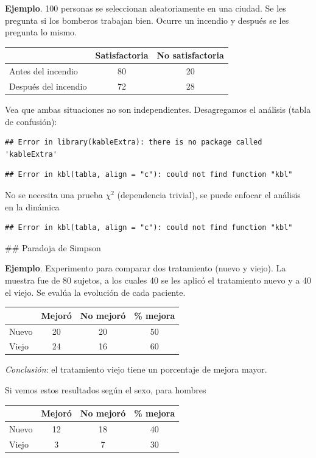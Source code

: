 \documentclass[
  12pt,
]{book}
\begin{document}
\textbf{Ejemplo}. 100 personas se seleccionan aleatoriamente en una ciudad. Se les pregunta si los bomberos trabajan bien. Ocurre un incendio y después se les pregunta lo mismo.

\begin{longtable}[]{@{}lcc@{}}
\toprule
& Satisfactoria & No satisfactoria\tabularnewline
\midrule
\endhead
Antes del incendio & 80 & 20\tabularnewline
Después del incendio & 72 & 28\tabularnewline
\bottomrule
\end{longtable}

Vea que ambas situaciones no son independientes. Desagregamos el análisis (tabla de confusión):

\begin{verbatim}
## Error in library(kableExtra): there is no package called 'kableExtra'
\end{verbatim}

\begin{verbatim}
## Error in kbl(tabla, align = "c"): could not find function "kbl"
\end{verbatim}

No se necesita una prueba \(\chi^2\) (dependencia trivial), se puede enfocar el análisis en la dinámica

\begin{verbatim}
## Error in kbl(tabla, align = "c"): could not find function "kbl"
\end{verbatim}

\#\# Paradoja de Simpson

\textbf{Ejemplo}. Experimento para comparar dos tratamiento (nuevo y viejo). La muestra fue de 80 sujetos, a los cuales 40 se les aplicó el tratamiento nuevo y a 40 el viejo. Se evalúa la evolución de cada paciente.

\begin{longtable}[]{@{}lccc@{}}
\toprule
& Mejoró & No mejoró & \% mejora\tabularnewline
\midrule
\endhead
Nuevo & 20 & 20 & 50\tabularnewline
Viejo & 24 & 16 & 60\tabularnewline
\bottomrule
\end{longtable}

\emph{Conclusión}: el tratamiento viejo tiene un porcentaje de mejora mayor.

Si vemos estos resultados según el sexo, para hombres

\begin{longtable}[]{@{}lccc@{}}
\toprule
& Mejoró & No mejoró & \% mejora\tabularnewline
\midrule
\endhead
Nuevo & 12 & 18 & 40\tabularnewline
Viejo & 3 & 7 & 30\tabularnewline
\bottomrule
\end{longtable}
\end{document}
